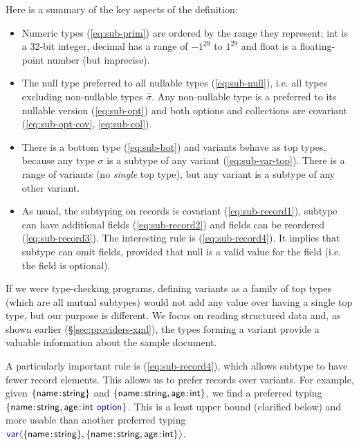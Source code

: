 \documentclass[10pt,preprint,blind,clearpagebib]{sigplanconf}
\newcommand{\langl}{\begin{picture}(4.5,7)
\put(1.1,2.5){\rotatebox{60}{\line(1,0){5.5}}}
\put(1.1,2.5){\rotatebox{300}{\line(1,0){5.5}}}
\end{picture}}
\newcommand{\rangl}{\begin{picture}(4.5,7)
\put(.9,2.5){\rotatebox{120}{\line(1,0){5.5}}}
\put(.9,2.5){\rotatebox{240}{\line(1,0){5.5}}}
\end{picture}}
\newcommand{\kvd}[1]{\textnormal{\textcolor{kvdclr}{\sffamily #1}}}
\newcommand{\ident}[1]{\textnormal{\sffamily #1}}
\begin{document}

\noindent
Here is a summary of the key aspects of the definition:
\begin{itemize}
\item Numeric types (\ref{eq:sub-prim}) are ordered by the range they represent;
  \ident{int} is a 32-bit integer, \ident{decimal} has a range of $-1^{29}$ to $1^{29}$ and 
  \ident{float} is a floating-point number (but imprecise).

\item The \kvd{null} type preferred to all nullable types (\ref{eq:sub-null}), i.e. all 
  types excluding non-nullable types $\hat{\sigma}$. Any non-nullable type is a 
  preferred to its nullable version (\ref{eq:sub-opt}) and both options and collections are 
  covariant (\ref{eq:sub-opt-cov}, \ref{eq:sub-col}).

\item There is a bottom type (\ref{eq:sub-bot}) and variants behave as top types, because
  any type $\sigma$ is a subtype of any variant (\ref{eq:sub-var-top}). There is a range of
  variants (no \emph{single} top type), but any variant is a subtype of any other variant.

\item As usual, the subtyping on records is covariant (\ref{eq:sub-record1}), subtype can have 
  additional fields (\ref{eq:sub-record2}) and fields can  be reordered (\ref{eq:sub-record3}). 
  The interesting rule is (\ref{eq:sub-record4}). It implies that subtype can omit fields, 
  provided that \kvd{null} is a valid value for the field (i.e. the field is optional).
\end{itemize}

\noindent
If we were type-checking programs, defining variants as a family of top types (which are all 
mutual subtypes) would not add any value over having a single top type, but our purpose is 
different. We focus on reading structured data and, as shown earlier (\S\ref{sec:providers-xml}), 
the types forming a variant provide a valuable information about the sample document.

A particularly important rule is (\ref{eq:sub-record4}), which allows subtype to have fewer record 
elements. This allows us to prefer records over variants. For example, given 
$\{ \ident{name}\!:\!\ident{string} \}$ and $\{ \ident{name}\!:\!\ident{string}, \ident{age}\!:\!\ident{int} \}$,
we find a preferred typing $\{ \ident{name}\!:\!\ident{string}, \ident{age}\!:\!\ident{int}~\kvd{option} \}$.
This is a least upper bound (clarified below) and more usable than another preferred typing 
$\kvd{var}\langl \{ \ident{name}\!:\!\ident{string} \}, \{ \ident{name}\!:\!\ident{string}, \ident{age}\!:\!\ident{int} \}\rangl$.
\end{document}
